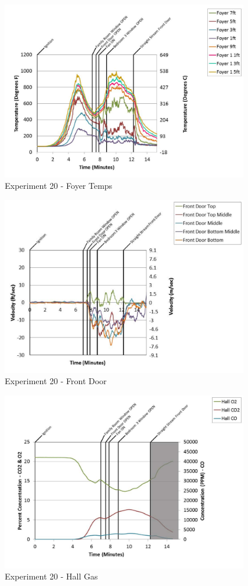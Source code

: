 \documentclass{article}
\begin{document}
\begin{appendices}
	\begin{figure}[h!]
		\centering
		\includegraphics[height=3.05in]{0_Images/Results_Charts/Exp_20_Charts/FoyerTemps.pdf}
		\caption{Experiment 20 - Foyer Temps}
	\end{figure}
 
	\clearpage

	\begin{figure}[h!]
		\centering
		\includegraphics[height=3.05in]{0_Images/Results_Charts/Exp_20_Charts/FrontDoor.pdf}
		\caption{Experiment 20 - Front Door}
	\end{figure}
 

	\begin{figure}[h!]
		\centering
		\includegraphics[height=3.05in]{0_Images/Results_Charts/Exp_20_Charts/HallGas.pdf}
		\caption{Experiment 20 - Hall Gas}
	\end{figure}
 

\end{appendices}
\end{document}
